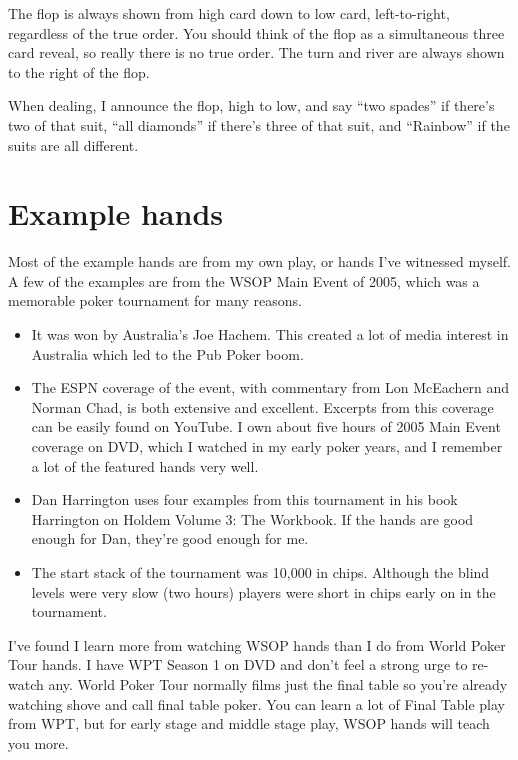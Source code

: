 The flop is always shown from high card down to low card, left-to-right,
regardless of the true order. You should think of the flop as a
simultaneous three card reveal, so really there is no true order. The turn
and river are always shown to the right of the flop.

When dealing, I announce the flop, high to low, and say ``two spades''
if there's two of that suit, ``all diamonds'' if there's three of that
suit, and ``Rainbow'' if the suits are all different.


\section*{Example hands}

Most of the example hands are from my own play, or hands I've
witnessed myself. A few of the examples are from the WSOP Main Event
of 2005, which was a memorable poker tournament for many reasons.

\begin{itemize}
  \item It was won by Australia's Joe Hachem. This created a lot of
    media interest in Australia which led to the Pub Poker boom.
  \item The ESPN coverage of the event, with commentary from
    Lon McEachern and Norman Chad, is both extensive and
    excellent. Excerpts from this coverage can be easily found on
    YouTube. I own about five hours of 2005 Main Event coverage on
    DVD, which I watched in my early poker years, and I remember a lot
    of the featured hands very well.
  \item Dan Harrington uses four examples from this tournament in his
    book Harrington on Holdem Volume 3: The Workbook. If the hands are
    good enough for Dan, they're good enough for me.
  \item The start stack of the tournament was 10,000 in
    chips. Although the blind levels were very slow (two hours)
    players were short in chips early on in the tournament.
\end{itemize}

I've found I learn more from watching WSOP hands than I do
from World Poker Tour hands. I have WPT Season 1 on DVD and don't feel
a strong urge to re-watch any. World Poker Tour normally films just the
final table so you're already watching shove and call final table
poker. You can learn a lot of Final Table play from WPT, but for early
stage and middle stage play, WSOP hands will teach you more.
